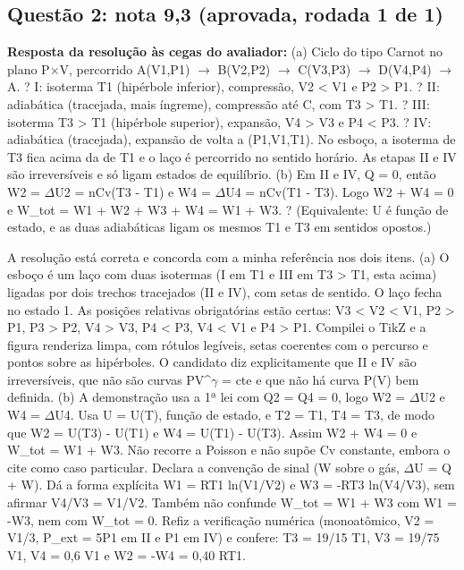 \documentclass{article}%
\begin{document}
\subsection*{Questão 2: nota 9,3 (aprovada, rodada 1 de 1)}%
\textbf{Resposta da resolução às cegas do avaliador:} (a) Ciclo do tipo Carnot no plano P$\times$V, percorrido A(V1,P1) $\to$ B(V2,P2) $\to$ C(V3,P3) $\to$ D(V4,P4) $\to$ A.\newline%
? I: isoterma T1 (hipérbole inferior), compressão, V2 < V1 e P2 > P1.\newline%
? II: adiabática (tracejada, mais íngreme), compressão até C, com T3 > T1.\newline%
? III: isoterma T3 > T1 (hipérbole superior), expansão, V4 > V3 e P4 < P3.\newline%
? IV: adiabática (tracejada), expansão de volta a (P1,V1,T1).\newline%
No esboço, a isoterma de T3 fica acima da de T1 e o laço é percorrido no sentido horário. As etapas II e IV são irreversíveis e só ligam estados de equilíbrio.\newline%
\newline%
(b) Em II e IV, Q = 0, então W2 = $\Delta$U2 = nCv(T3 - T1) e W4 = $\Delta$U4 = nCv(T1 - T3). Logo W2 + W4 = 0 e W\_tot = W1 + W2 + W3 + W4 = W1 + W3. ? (Equivalente: U é função de estado, e as duas adiabáticas ligam os mesmos T1 e T3 em sentidos opostos.)\par %
A resolução está correta e concorda com a minha referência nos dois itens.\newline%
\newline%
(a) O esboço é um laço com duas isotermas (I em T1 e III em T3 > T1, esta acima) ligadas por dois trechos tracejados (II e IV), com setas de sentido. O laço fecha no estado 1. As posições relativas obrigatórias estão certas: V3 < V2 < V1, P2 > P1, P3 > P2, V4 > V3, P4 < P3, V4 < V1 e P4 > P1. Compilei o TikZ e a figura renderiza limpa, com rótulos legíveis, setas coerentes com o percurso e pontos sobre as hipérboles. O candidato diz explicitamente que II e IV são irreversíveis, que não são curvas PV\^{}$\gamma$ = cte e que não há curva P(V) bem definida.\newline%
\newline%
(b) A demonstração usa a 1ª lei com Q2 = Q4 = 0, logo W2 = $\Delta$U2 e W4 = $\Delta$U4. Usa U = U(T), função de estado, e T2 = T1, T4 = T3, de modo que W2 = U(T3) - U(T1) e W4 = U(T1) - U(T3). Assim W2 + W4 = 0 e W\_tot = W1 + W3. Não recorre a Poisson e não supõe Cv constante, embora o cite como caso particular. Declara a convenção de sinal (W sobre o gás, $\Delta$U = Q + W). Dá a forma explícita W1 = RT1 ln(V1/V2) e W3 = -RT3 ln(V4/V3), sem afirmar V4/V3 = V1/V2. Também não confunde W\_tot = W1 + W3 com W1 = -W3, nem com W\_tot = 0. Refiz a verificação numérica (monoatômico, V2 = V1/3, P\_ext = 5P1 em II e P1 em IV) e confere: T3 = 19/15 T1, V3 = 19/75 V1, V4 = 0,6 V1 e W2 = -W4 = 0,40 RT1.\newline%
\end{document}
